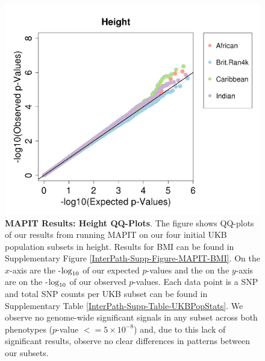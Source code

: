 \documentclass[12pt,a4paper]{article}
\def\log{{\rm log}}
\begin{document}
\begin{figure}[htb]
\centering
\includegraphics[scale=.45]{Images/Main/InterPath_Main_Figure_MAPIT_vs3_Height.png}
\caption[TBD]{\textbf{MAPIT Results: Height QQ-Plots}. The figure shows QQ-plots of our results from running MAPIT on our four initial UKB population subsets in height. Results for BMI can be found in Supplementary Figure \ref{InterPath-Supp-Figure-MAPIT-BMI}. On the $x$-axis are the -$\log_{10}$ of our expected $p$-values and the on the $y$-axis are on the -$\log_{10}$ of our observed $p$-values. Each data point is a SNP and total SNP counts per UKB subset can be found in Supplementary Table \ref{InterPath-Supp-Table-UKBPopStats}. We observe no genome-wide significant signals in any subset across both phenotypes ($p$-value $<= 5\times10^{-8}$) and, due to this lack of significant results, observe no clear differences in patterns between our subsets.}
\label{InterPath-Main-Figure-MAPIT-Height}
\end{figure}
\end{document}
